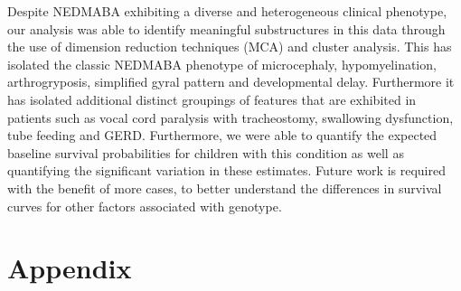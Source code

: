 \documentclass[
  authoryear,
  preprint,
  3p]{elsarticle}
\begin{document}
Despite NEDMABA exhibiting a diverse and heterogeneous clinical
phenotype, our analysis was able to identify meaningful substructures in
this data through the use of dimension reduction techniques (MCA) and
cluster analysis. This has isolated the classic NEDMABA phenotype of
microcephaly, hypomyelination, arthrogryposis, simplified gyral pattern
and developmental delay. Furthermore it has isolated additional distinct
groupings of features that are exhibited in patients such as vocal cord
paralysis with tracheostomy, swallowing dysfunction, tube feeding and
GERD. Furthermore, we were able to quantify the expected baseline
survival probabilities for children with this condition as well as
quantifying the significant variation in these estimates. Future work is
required with the benefit of more cases, to better understand the
differences in survival curves for other factors associated with
genotype.

\newpage

\hypertarget{appendix}{%
\section{Appendix}\label{appendix}}
\end{document}
